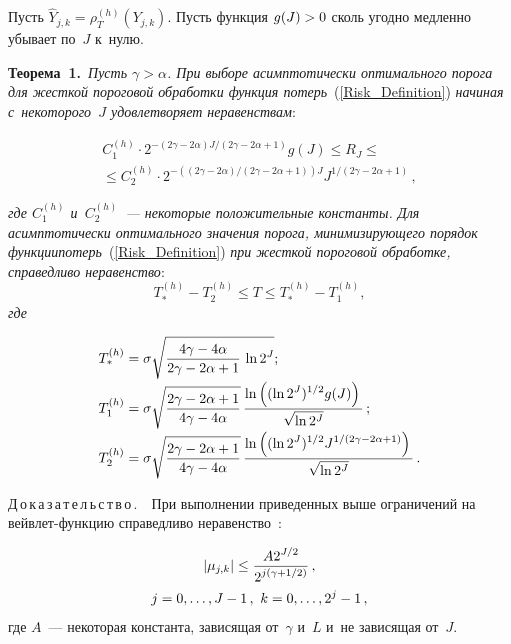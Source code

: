 \begin{multicols}{2}
Пусть $\hat{Y}_{j,k}=\rho_T^{(h)}(Y_{j,k})$. Пусть функция $g(J)\hm>0$ сколь 
угодно медленно убывает по~$J$ к~нулю.

\vspace{2pt}

\noindent
\textbf{Теорема~1.}\ \textit{Пусть $\gamma>\alpha$. При выборе асимптотически 
оптимального порога для жесткой пороговой обработки функция 
потерь}~(\ref{Risk_Definition}) \textit{начиная с~некоторого~$J$ 
удовле\-тво\-ря\-ет неравенствам}:

\vspace*{-2pt}

\noindent
\begin{multline*}
C_1^{(h)}\cdot2^{-({2\gamma-2\alpha})J/({2\gamma-2\alpha+1})}
g(J)\leq R_J\leq{}\\[-1pt]
{}\leq
 C_2^{(h)}\cdot2^{-(({2\gamma-2\alpha})/({2\gamma-2\alpha+1}))J}
 J^{1/(2\gamma-2\alpha+1)}\,,
 \end{multline*}
 
 \vspace*{-4pt}
 
 \noindent
\textit{где $C_1^{(h)}$ и~$C_2^{(h)}$~--- некоторые положительные константы.
Для асимптотически оптимального зна\-чения порога, ми\-ни\-ми\-зи\-ру\-юще\-го 
порядок функции\linebreak потерь}~(\ref{Risk_Definition}) \textit{при жест\-кой пороговой обработке, 
справедливо неравенство}:
$$
T_*^{(h)}-T_2^{(h)}\leq T\leq T_*^{(h)}-T_1^{(h)},
$$ 
\textit{где}

\noindent
\begin{align*}
T_*^{(h)}&=\sigma\sqrt{\displaystyle\frac{\displaystyle 4\gamma-4\alpha\mathstrut}{\displaystyle 2\gamma-2\alpha+1\mathstrut}\,\ln2^J};
\\[-2pt]
T_1^{(h)}&=\sigma\sqrt{\displaystyle\frac{\displaystyle 2\gamma-2\alpha+1\mathstrut}{\displaystyle 4\gamma-4\alpha\mathstrut}}
\, \displaystyle\frac{\displaystyle \ln\left((\ln 2^J)^{1/2}g(J)\right)\mathstrut}{\displaystyle \sqrt{\ln 2^J}\mathstrut}\,;
\\[-2pt]
T_2^{(h)}&=\sigma\sqrt{\displaystyle\frac{\displaystyle 2\gamma-2\alpha+1\mathstrut}{\displaystyle 4\gamma-4\alpha\mathstrut}}\,
\displaystyle\frac{\displaystyle \ln\left((\ln 2^J)^{1/2}J^{1/(2\gamma-2\alpha+1)}\right)\mathstrut}{\displaystyle \sqrt{\ln 2^J}\mathstrut}\,.
\end{align*}

\noindent
{Д\,о\,к\,а\,з\,а\,т\,е\,л\,ь\,с\,т\,в\,о\,.}\ \ 
При выполнении приведенных выше ограничений на вейв\-лет-функ\-цию 
справедливо неравенство~\cite{Mal99}:

\noindent
\begin{multline}
\label{Wavelet_CoeffDecacy}
\left\vert\mu_{j,k}\right\vert\leq\displaystyle\frac{\displaystyle A2^{J/2}\mathstrut}{\displaystyle 2^{j\left(\gamma+1/2\right)}\mathstrut}\,, \\
j=0,\ldots,J-1\,,\ k=0,\ldots,2^j-1\,,
\end{multline}
где $A$~--- некоторая константа, зависящая от~$\gamma$ и~$L$ и~не зависящая от~$J$.



\end{multicols}
